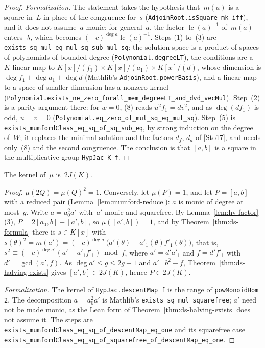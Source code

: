 \begin{proof}
\emph{Formalization.} The statement takes the hypothesis that~$m(a)$ is a square in~$L$ in place
of the congruence for~$s$ (\texttt{AdjoinRoot.isSquare\_mk\_iff}), and it does not assume~$a$
monic: for general~$a$, the factor $\operatorname{lc}(a)^{-1}$ of~$m(a)$ enters~$\lambda$, which
becomes $(-c)^{\deg a}\operatorname{lc}(a)^{-1}$. Steps (1) to~(3) are
\texttt{exists\_sq\_mul\_eq\_mul\_sq\_sub\_mul\_sq}: the solution space is a product of spaces of
polynomials of bounded degree (\texttt{Polynomial.degreeLT}), the conditions are a $K$-linear map
to $K[x]/(f_1) \times K[x]/(a_1) \times K[x]/(d)$, whose dimension is
$\deg f_1 + \deg a_1 + \deg d$ (Mathlib's \texttt{AdjoinRoot.powerBasis}), and a linear map to a
space of smaller dimension has a nonzero kernel
(\texttt{Polynomial.exists\_ne\_zero\_forall\_mem\_degreeLT\_and\_dvd\_vecMul}). Step~(2) is a
parity argument there: for $w = 0$, (8) reads $u^2f_1 = dv^2$, and as $\deg(df_1)$ is odd,
$u = v = 0$ (\texttt{Polynomial.eq\_zero\_of\_mul\_sq\_eq\_mul\_sq}). Step~(5) is
\texttt{exists\_mumfordClass\_eq\_sq\_of\_sq\_sub\_eq}, by strong induction on the degree of~$W$;
it replaces the minimal solution and the factors $d_f$, $d_a$ of [Sto17], and needs only~(8) and
the second congruence. The conclusion is that $[a, b]$ is a square in the multiplicative group
\texttt{HypJac K f}.
\end{proof}

\begin{theorem}
\label{thm:ds-kernel}
\leanok
{}
The kernel of~$\mu$ is~$2J(K)$.
\end{theorem}

\begin{proof}
\leanok
{}
$\mu(2Q) = \mu(Q)^2 = 1$. Conversely, let $\mu(P) = 1$, and let $P = [a, b]$ with a reduced pair
(Lemma~\ref{lem:mumford-reduce}): $a$ is monic of degree at most~$g$. Write $a = a_0^2a'$
with~$a'$ monic and squarefree. By Lemma~\ref{lem:hv-factor}\,(3), $P = 2[a_0, b] + [a', b]$, so
$\mu([a', b]) = 1$, and by Theorem~\ref{thm:ds-formula} there is $s \in K[x]$ with
$s(\theta)^2 = m(a') = (-c)^{\deg a'}\bigl(a'(\theta) - a'_1(\theta)f'_1(\theta)\bigr)$, that is,
$s^2 \equiv (-c)^{\deg a'}(a' - a'_1f'_1) \bmod f$, where $a' = d'a'_1$ and $f = d'f'_1$ with
$d' = \gcd(a', f)$. As $\deg a' \le g \le 2g + 1$ and $a' \mid b^2 - f$,
Theorem~\ref{thm:ds-halving-exists} gives $[a', b] \in 2J(K)$, hence $P \in 2J(K)$.

\emph{Formalization.} The kernel of \texttt{HypJac.descentMap f} is the range of
\texttt{powMonoidHom 2}. The decomposition $a = a_0^2a'$ is Mathlib's
\texttt{exists\_sq\_mul\_squarefree}; $a'$ need not be made monic, as the Lean form of
Theorem~\ref{thm:ds-halving-exists} does not assume it. The steps are
\texttt{exists\_mumfordClass\_eq\_sq\_of\_descentMap\_eq\_one} and its squarefree case
\texttt{exists\_mumfordClass\_eq\_sq\_of\_squarefree\_of\_descentMap\_eq\_one}.
\end{proof}

